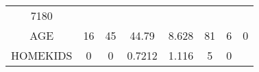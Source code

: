 \documentclass[]{article}
\begin{document}
\begin{longtable}[]{@{}cccccccc@{}}
\begin{minipage}[t]{0.14\columnwidth}
7180\strut
\end{minipage}\tabularnewline
\begin{minipage}[t]{0.11\columnwidth}\centering\strut
AGE\strut
\end{minipage} & \begin{minipage}[t]{0.07\columnwidth}\centering\strut
16\strut
\end{minipage} & \begin{minipage}[t]{0.09\columnwidth}\centering\strut
45\strut
\end{minipage} & \begin{minipage}[t]{0.09\columnwidth}\centering\strut
44.79\strut
\end{minipage} & \begin{minipage}[t]{0.09\columnwidth}\centering\strut
8.628\strut
\end{minipage} & \begin{minipage}[t]{0.09\columnwidth}\centering\strut
81\strut
\end{minipage} & \begin{minipage}[t]{0.13\columnwidth}\centering\strut
6\strut
\end{minipage} & \begin{minipage}[t]{0.14\columnwidth}\centering\strut
0\strut
\end{minipage}\tabularnewline
\begin{minipage}[t]{0.11\columnwidth}\centering\strut
HOMEKIDS\strut
\end{minipage} & \begin{minipage}[t]{0.07\columnwidth}\centering\strut
0\strut
\end{minipage} & \begin{minipage}[t]{0.09\columnwidth}\centering\strut
0\strut
\end{minipage} & \begin{minipage}[t]{0.09\columnwidth}\centering\strut
0.7212\strut
\end{minipage} & \begin{minipage}[t]{0.09\columnwidth}\centering\strut
1.116\strut
\end{minipage} & \begin{minipage}[t]{0.09\columnwidth}\centering\strut
5\strut
\end{minipage} & \begin{minipage}[t]{0.13\columnwidth}\centering\strut
0\strut
\end{minipage} & \begin{minipage}[t]{0.14\columnwidth}\centering\strut

\end{minipage}
\end{longtable}
\end{document}
